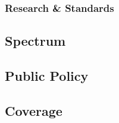 \documentclass[journal]{IEEEtran}
\begin{document}
\subsubsection{Research & Standards}

\subsection{Spectrum}

\subsection{Public Policy}


\subsection{Coverage}
\end{document}
